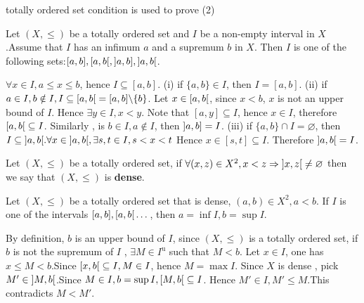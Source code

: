 \documentclass{book}
\numberwithin{equation}{section}
\begin{document}
\begin{remark}
    totally ordered set condition is used to prove (2)
\end{remark}
\begin{propositionenv}
   Let $(X, \le )$ be a totally ordered set and $I $ be a  non-empty interval in $X$  .Assume that $I$ has an infimum $a$ and a supremum $b$ in $X$. Then $I$ is one of the following sets:$[a, b], \interval[open right]{a}{b}, \interval[open left]{a}{b}, \interval[open]{a}{b}$.
\end{propositionenv}
\begin{proofenv}
    $\forall x\in I , a\le x\le b $, hence $I\subseteq [a, b]$.
    \newline
    (i) if $\{a, b\}\in I$,  then $I=[a, b]$.
    \newline
    (ii) if $a\in I,  b\notin I, I\subseteq\interval[open right]{a}{b}=[a, b]\backslash\{b\}$. Let $x\in \interval[open right]{a}{b}$,  since $x<b$,  $x$ is not an upper bound of $I$. Hence $\exists y\in I,  x<y$. Note that $[a, y]\subseteq I$,  hence $x\in I$,  therefore $\interval[open right]{a}{b}\subseteq I$. Similarly ,  is $b\in I, a\notin I$,  then $\interval[open left]{a}{b}=I$.
    \newline
    (iii) if $\{a, b\}\cap I=\varnothing$,  then $I\subseteq\interval[open]{a}{b} .\forall x\in \interval[open]{a}{b}, \exists s, t\in I, s<x<t$ Hence $x\in [s, t]\subseteq I$. Therefore $\interval[open]{a}{b}=I$.

\end{proofenv}
\begin{definitionenv}[Dense]
    Let $(X, \le )$ be a totally ordered set,  if $\forall (x, z)\in X^2, x<z\Rightarrow \interval[open]{x}{z}\not=\varnothing$ then we say that $(X, \le)$ is \textbf{dense}.
\end{definitionenv}
\begin{propositionenv}
    Let $(X, \le )$ be a totally ordered set that is dense,  $(a, b)\in X^2, a<b$. If $I$ is one of the intervals $[a, b], \interval[open right]{a}{b}\dots$,  then $a=\inf I, b=\sup I$.
\end{propositionenv}
\begin{proofenv}
    By definition,  $b$ is an upper bound of $I$,  since $(X, \le)$ is a totally ordered set, if $b$ is not the supremum of $I$ ,  $\exists M\in I^\mathrm{u}$ such that $M<b$.
    Let $x\in I$, one has $x\le M <b$.Since $\interval[open right]{x}{b}\subseteq I, M\in I$,  hence $M=\max I$. Since $X$ is dense , pick $M'\in \interval[open]{M}{b}$.Since $M\in I, b=\sup I, \interval[open right]{M}{b}\subseteq I$. Hence $M'\in I, M'\le M$.This contradicts $M<M'$.
\end{proofenv}
\end{document}
